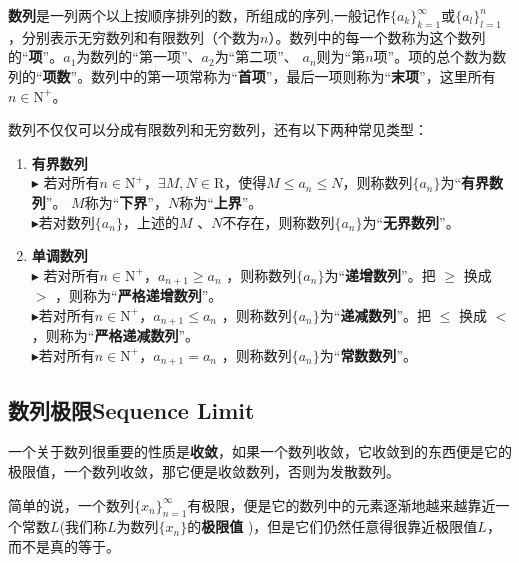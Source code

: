 \documentclass[UTF8]{ctexart}
\begin{document}
\textbf{数列}是一列两个以上按顺序排列的数，所组成的序列,一般记作\( \{ a_k\}_{k=1}^{\infty} \)或\( \{ a_l\}_{l=1}^{n} \)，分别表示无穷数列和有限数列（个数为$n$）。数列中的每一个数称为这个数列的“\textbf{项}”。$a_1$为数列的“第一项”、$a_2$为“第二项”、 $a_n$则为“第$n$项”。项的总个数为数列的“\textbf{项数}”。数列中的第一项常称为“\textbf{首项}”，最后一项则称为“\textbf{末项}”，这里所有$n \in \text{N}^{+}$。
\begin{info}[Notice:] %
	数列不仅仅可以分成有限数列和无穷数列，还有以下两种常见类型：
	\begin{enumerate}
		\item{\textbf{有界数列}}\\
		 $\blacktriangleright$ 若对所有\( n \in \text{N}^{+} \)，\( \exists M, N \in \text{R} \)，使得\( M \leqslant a_n \leqslant N \)，则称数列$\{ a_n \}$为“\textbf{有界数列}”。 $ M $称为“\textbf{下界}”，$ N $称为“\textbf{上界}”。\\
         $\blacktriangleright$若对数列$\{ a_n \}$，上述的$ M $ 、$ N $不存在，则称数列$\{ a_n \}$为“\textbf{无界数列}”。
		\item{\textbf{单调数列}}\\
		$\blacktriangleright$ 若对所有\( n \in \text{N}^{+} \)，\( a_{n+1} \geqslant a_n \) ，则称数列$\{ a_n \}$为“\textbf{递增数列}”。把 $\geqslant$ 换成 $>$ ，则称为“\textbf{严格递增数列}”。\\
        $\blacktriangleright$若对所有\( n \in \text{N}^{+} \)，\( a_{n+1} \leqslant a_n \) ，则称数列$\{ a_n \}$为“\textbf{递减数列}”。把 $\leqslant$ 换成 $<$ ，则称为“\textbf{严格递减数列}”。\\
        $\blacktriangleright$若对所有\( n \in \text{N}^{+} \)，\( a_{n+1} = a_n \) ，则称数列$\{ a_n \}$为“\textbf{常数数列}”。\\
	\end{enumerate}
\end{info}

\subsection{数列极限Sequence Limit}

一个关于数列很重要的性质是\textbf{收敛}，如果一个数列收敛，它收敛到的东西便是它的极限值，一个数列收敛，那它便是收敛数列，否则为发散数列。

简单的说，一个数列$\{ x_n \}_{n=1}^{\infty}$有极限，便是它的数列中的元素逐渐地越来越靠近一个常数$L$(我们称$L$为数列$\{ x_n \}$的\textbf{极限值} )，但是它们仍然任意得很靠近极限值$L$，而不是真的等于。
\end{document}
